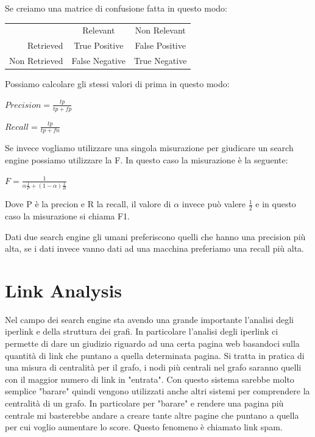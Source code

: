 \documentclass[14pt]{extreport}
\begin{document}
Se creiamo una matrice di confusione fatta in questo modo:

\begin{center}
\begin{tabular}{rcc}
&Relevant&Non Relevant\\
Retrieved&True Positive&False Positive\\
Non Retrieved&False Negative&True Negative\\
\end{tabular}
\end{center}

Possiamo calcolare gli stessi valori di prima in questo modo:
\newline
\centerline{$Precision = \frac{tp}{tp+fp}$}

\newline
\centerline{$Recall = \frac{tp}{tp+fn}$}

Se invece vogliamo utilizzare una singola misurazione per giudicare un search engine possiamo utilizzare la F.
In questo caso la misurazione è la seguente:
\newline
\centerline{$F = \frac{1}{\alpha{\frac{1}{P}+(1-\alpha)\frac{1}{R}}}$}
Dove P è la precion e R la recall, il valore di $\alpha$ invece può valere $\frac{1}{2}$ e in questo caso la misurazione si chiama F1.

Dati due search engine gli umani preferiscono quelli che hanno una precision più alta, se i dati invece vanno dati ad una macchina preferiamo una recall più alta.


\chapter{Link Analysis}

Nel campo dei search engine sta avendo una grande importante l'analisi degli iperlink e della struttura dei grafi. In particolare l'analisi degli iperlink ci permette di dare un giudizio riguardo ad una certa pagina web basandoci sulla quantità di link che puntano a quella determinata pagina. Si tratta in pratica di una misura di centralità per il grafo, i nodi più centrali nel grafo saranno quelli con il maggior numero di link in "entrata".
Con questo sistema sarebbe molto semplice "barare" quindi vengono utilizzati anche altri sistemi per comprendere la centralità di un grafo. In particolare per "barare" e rendere una pagina più centrale mi basterebbe andare a creare tante altre pagine che puntano a quella per cui voglio aumentare lo score. Questo fenomeno è chiamato link spam.
\end{document}

